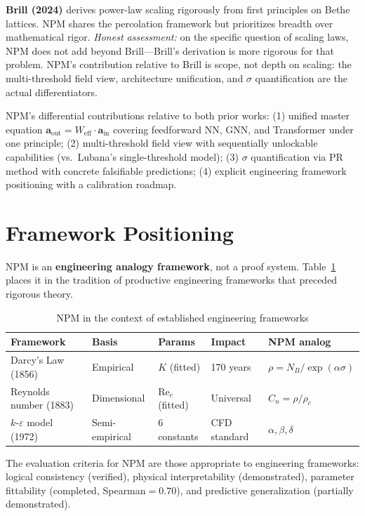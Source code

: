 \documentclass[11pt,a4paper]{article}
\newcommand{\Weff}{W_{\text{eff}}}
\begin{document}
\textbf{Brill (2024)} \citep{brill2024scaling} derives power-law scaling
rigorously from first principles on Bethe lattices. NPM shares the percolation
framework but prioritizes breadth over mathematical rigor.
\emph{Honest assessment:} on the specific question of scaling laws,
NPM does not add beyond Brill---Brill's derivation is more rigorous for that problem.
NPM's contribution relative to Brill is scope, not depth on scaling:
the multi-threshold field view, architecture unification, and $\sigma$ quantification
are the actual differentiators.

NPM's differential contributions relative to both prior works:
(1) unified master equation $\mathbf{a}_{\text{out}} = \Weff\cdot\mathbf{a}_{\text{in}}$
covering feedforward NN, GNN, and Transformer under one principle;
(2) multi-threshold field view with sequentially unlockable capabilities
(vs.\ Lubana's single-threshold model);
(3) $\sigma$ quantification via PR method with concrete falsifiable predictions;
(4) explicit engineering framework positioning with a calibration roadmap.

\section{Framework Positioning}

NPM is an \textbf{engineering analogy framework}, not a proof system.
Table~\ref{tab:positioning} places it in the tradition of productive
engineering frameworks that preceded rigorous theory.

\begin{table}[ht]
\centering
\caption{NPM in the context of established engineering frameworks}
\label{tab:positioning}
\small
\begin{tabular}{p{3.2cm}lllp{3.2cm}}
\toprule
\textbf{Framework} & \textbf{Basis} & \textbf{Params} & \textbf{Impact} & \textbf{NPM analog} \\
\midrule
Darcy's Law (1856) & Empirical & $K$ (fitted) & 170 years & $\rho = N_B/\exp(\alpha\sigma)$ \\
Reynolds number (1883) & Dimensional & $\text{Re}_c$ (fitted) & Universal & $C_n = \rho/\rho_c$ \\
$k$-$\varepsilon$ model (1972) & Semi-empirical & 6 constants & CFD standard & $\alpha,\beta,\delta$ \\
\bottomrule
\end{tabular}
\end{table}

The evaluation criteria for NPM are those appropriate to engineering frameworks:
logical consistency (verified), physical interpretability (demonstrated),
parameter fittability (completed, Spearman$=0.70$), and predictive generalization (partially demonstrated).
\end{document}
